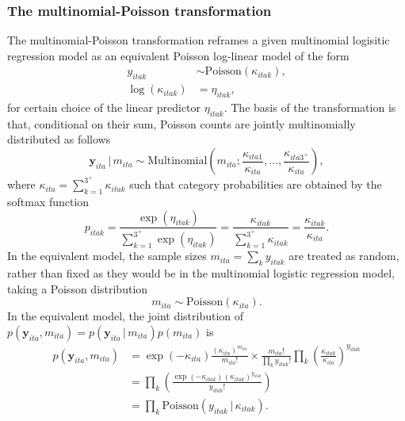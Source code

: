 \documentclass[a4paper, nobind]{templates/ociamthesis}
\begin{document}
\hypertarget{the-multinomial-poisson-transformation}{%
\subsubsection{The multinomial-Poisson transformation}\label{the-multinomial-poisson-transformation}}

The multinomial-Poisson transformation reframes a given multinomial logisitic regression model as an equivalent Poisson log-linear model of the form
\begin{align}
    y_{itak} &\sim \text{Poisson}(\kappa_{itak}), \label{eq:poisson} \\
    \log(\kappa_{itak}) &= \eta_{itak},
\end{align}
for certain choice of the linear predictor \(\eta_{itak}\).
The basis of the transformation is that, conditional on their sum, Poisson counts are jointly multinomially distributed \autocite{mccullagh1989generalized} as follows
\begin{equation}
    \mathbf{y}_{ita} \, | \, m_{ita} \sim \text{Multinomial} \left( m_{ita}; \frac{\kappa_{ita1}}{\kappa_{ita}}, \ldots, \frac{\kappa_{ita3^{+}}}{\kappa_{ita}} \right),
\end{equation}
where \(\kappa_{ita} = \sum_{k = 1}^{3^{+}} \kappa_{itak}\) such that category probabilities are obtained by the softmax function
\begin{equation}
    p_{itak} = \frac{\exp(\eta_{itak})}{\sum_{k = 1}^{3^{+}} \exp(\eta_{itak})} = \frac{\kappa_{itak}}{\sum_{k = 1}^{3^{+}} \kappa_{itak}} = \frac{\kappa_{itak}}{\kappa_{ita}}.
\end{equation}
In the equivalent model, the sample sizes \(m_{ita} = \sum_k y_{itak}\) are treated as random, rather than fixed as they would be in the multinomial logistic regression model, taking a Poisson distribution
\begin{equation}
    m_{ita} \sim \text{Poisson} \left( \kappa_{ita} \right).
\end{equation}
In the equivalent model, the joint distribution of \(p(\mathbf{y}_{ita}, m_{ita}) = p(\mathbf{y}_{ita} \, | \, m_{ita})p(m_{ita})\) is
\begin{align}
p(\mathbf{y}_{ita}, m_{ita}) &= \exp(-\kappa_{ita}) \frac{(\kappa_{ita})^{m_{ita}}}{m_{ita}!} \times \frac{m_{ita}!}{\prod_k y_{itak}!} \prod_k \left( \frac{\kappa_{itak}}{\kappa_{ita}} \right)^{y_{itak}} \\
&= \prod_k \left( \frac{\exp(-\kappa_{itak}) \left( \kappa_{itak} \right)^{y_{itak}}}{y_{itak}!} \right) \\
&= \prod_k \text{Poisson} \left( y_{itak} \, | \, \kappa_{itak} \right). \label{eq:prodpoisson}
\end{align}
\end{document}
